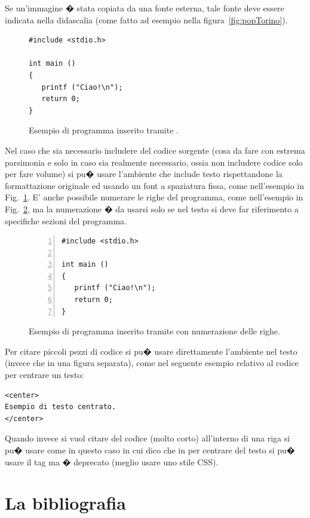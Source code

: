 Se un'immagine � stata copiata da una fonte esterna, tale fonte deve essere indicata nella didascalia (come fatto ad esempio nella figura~\ref{fig:popTorino}).

\begin{figure}[tb]
\HRule
\begin{lstlisting}
#include <stdio.h>

int main ()
{
   printf ("Ciao!\n");
   return 0;
}
\end{lstlisting}
\HRule
\caption{Esempio di programma inserito tramite .\label{fig:prog}}
\end{figure}
Nel caso che sia necessario includere del codice sorgente (cosa da fare con estrema parsimonia e solo in caso sia realmente necessario, ossia non includere codice solo per fare volume) si pu� usare l'ambiente  che include testo rispettandone la formattazione originale ed usando un font a spaziatura fissa, come nell'esempio in Fig.~\ref{fig:prog}.
E' anche possibile numerare le righe del programma, come nell'esempio in Fig.~\ref{fig:prog-num}, ma la numerazione � da usarsi solo se nel testo si deve far riferimento a specifiche sezioni del programma.

\begin{figure}[tb]
\HRule
\begin{lstlisting}[numbers=left]
#include <stdio.h>

int main ()
{
   printf ("Ciao!\n");
   return 0;
}
\end{lstlisting}
\HRule
\caption{Esempio di programma inserito tramite  con  numerazione delle righe.\label{fig:prog-num}}
\end{figure}

Per citare piccoli pezzi di codice si pu� usare direttamente l'ambiente  nel testo (invece che in una figura separata), come nel seguente esempio relativo al codice \html per centrare un testo:
\begin{lstlisting}
<center>
Esempio di testo centrato.
</center>
\end{lstlisting}
Quando invece si vuol citare del codice (molto corto) all'interno di una riga si pu� usare  come in questo caso in cui dico che in \html per centrare del testo si pu� usare il tag  ma � deprecato (meglio usare uno stile CSS).


\section{La bibliografia\label{sec:bibliografia}}

